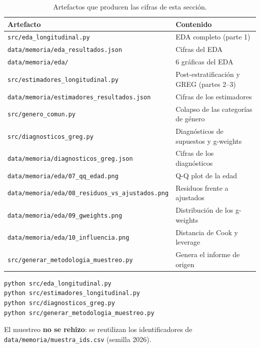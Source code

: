 \begin{table}[H]
  \centering
  \small
  \caption{Artefactos que producen las cifras de esta sección.}
  \label{tab:mues-artefactos}
  \begin{tabular}{@{}p{7.2cm}p{7.6cm}@{}}
    \toprule
    \textbf{Artefacto} & \textbf{Contenido} \\
    \midrule
    \texttt{src/eda\_longitudinal.py} & EDA completo (parte 1) \\
    \texttt{data/memoria/eda\_resultados.json} & Cifras del EDA \\
    \texttt{data/memoria/eda/} & 6 gráficas del EDA \\
    \texttt{src/estimadores\_longitudinal.py} & Post-estratificación y GREG
      (partes 2--3) \\
    \texttt{data/memoria/estimadores\_resultados.json} & Cifras de los estimadores \\
    \texttt{src/genero\_comun.py} & Colapso de las categorías de género \\
    \texttt{src/diagnosticos\_greg.py} & Diagnósticos de supuestos y g-weights \\
    \texttt{data/memoria/diagnosticos\_greg.json} & Cifras de los diagnósticos \\
    \texttt{data/memoria/eda/07\_qq\_edad.png} & Q-Q plot de la edad \\
    \texttt{data/memoria/eda/08\_residuos\_vs\_ajustados.png} & Residuos frente a
      ajustados \\
    \texttt{data/memoria/eda/09\_gweights.png} & Distribución de los g-weights \\
    \texttt{data/memoria/eda/10\_influencia.png} & Distancia de Cook y leverage \\
    \texttt{src/generar\_metodologia\_muestreo.py} & Genera el informe de origen \\
    \bottomrule
  \end{tabular}
\end{table}

\begin{verbatim}
python src/eda_longitudinal.py
python src/estimadores_longitudinal.py
python src/diagnosticos_greg.py
python src/generar_metodologia_muestreo.py
\end{verbatim}

El muestreo \textbf{no se rehizo}: se reutilizan los identificadores de
\texttt{data/memoria/muestra\_ids.csv} (semilla 2026).
